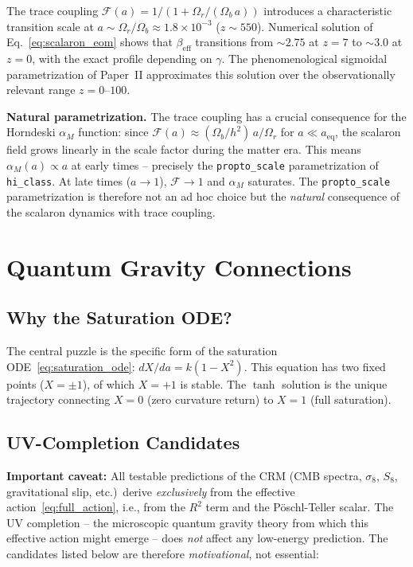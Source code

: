 \documentclass[aps,prd,twocolumn,superscriptaddress,nofootinbib]{revtex4-2}
\begin{document}
The trace coupling $\mathcal{F}(a) = 1/(1 + \Omega_r/(\Omega_b\,a))$ introduces a characteristic transition scale at $a \sim \Omega_r/\Omega_b \approx 1.8 \times 10^{-3}$ ($z \sim 550$). Numerical solution of Eq.~\eqref{eq:scalaron_eom} shows that $\beta_{\mathrm{eff}}$ transitions from $\sim 2.75$ at $z = 7$ to $\sim 3.0$ at $z = 0$, with the exact profile depending on $\gamma$. The phenomenological sigmoidal parametrization of Paper~II approximates this solution over the observationally relevant range $z = 0$--$100$.

\textbf{Natural parametrization.} The trace coupling has a crucial consequence for the Horndeski $\alpha_M$ function: since $\mathcal{F}(a) \approx (\Omega_b/h^2)\,a/\Omega_r$ for $a \ll a_{\mathrm{eq}}$, the scalaron field grows linearly in the scale factor during the matter era. This means $\alpha_M(a) \propto a$ at early times -- precisely the \texttt{propto\_scale} parametrization of \texttt{hi\_class}. At late times ($a \to 1$), $\mathcal{F} \to 1$ and $\alpha_M$ saturates. The \texttt{propto\_scale} parametrization is therefore not an ad hoc choice but the \textit{natural} consequence of the scalaron dynamics with trace coupling.


\section{Quantum Gravity Connections}
\label{sec:quantum_gravity}

\subsection{Why the Saturation ODE?}

The central puzzle is the specific form of the saturation ODE~\eqref{eq:saturation_ode}: $dX/da = k(1 - X^2)$. This equation has two fixed points ($X = \pm 1$), of which $X = +1$ is stable. The $\tanh$ solution is the unique trajectory connecting $X = 0$ (zero curvature return) to $X = 1$ (full saturation).

\subsection{UV-Completion Candidates}
\label{subsec:uv_candidates}

\textbf{Important caveat:} All testable predictions of the CRM (CMB spectra, $\sigma_8$, $S_8$, gravitational slip, etc.)\ derive \textit{exclusively} from the effective action~\eqref{eq:full_action}, i.e., from the $R^2$ term and the P\"oschl-Teller scalar. The UV completion -- the microscopic quantum gravity theory from which this effective action might emerge -- does \textit{not} affect any low-energy prediction. The candidates listed below are therefore \textit{motivational}, not essential:
\end{document}
